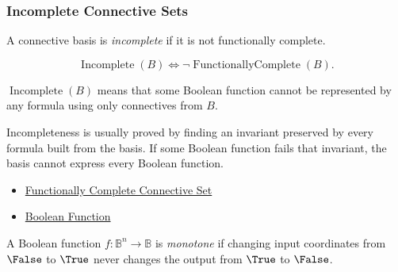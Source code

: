 \subsubsection*{Incomplete Connective Sets}

\begin{tcolorbox}[colback=propbox, colframe=propborder, arc=2pt,
  left=6pt, right=6pt, top=4pt, bottom=4pt,
  title={\small\textbf{Definition (Incomplete Connective Set)}},
  fonttitle=\small\bfseries]
\begin{definition}
\label{def:incomplete-connective-set-propositional-logic}
A connective basis is \emph{incomplete} if it is not functionally complete.
\end{definition}
\end{tcolorbox}

\begin{remark*}
\[
\operatorname{Incomplete}(B)
\Longleftrightarrow
\neg\operatorname{FunctionallyComplete}(B).
\]
\end{remark*}

\begin{remark*}
\(\operatorname{Incomplete}(B)\) means that some Boolean function cannot be
represented by any formula using only connectives from \(B\).
\end{remark*}

\begin{remark*}[Interpretation]
Incompleteness is usually proved by finding an invariant preserved by every
formula built from the basis. If some Boolean function fails that invariant, the
basis cannot express every Boolean function.
\end{remark*}

\begin{dependencies}
\begin{itemize}
  \item \hyperref[def:functionally-complete-connective-set-propositional-logic]{Functionally Complete Connective Set}
  \item \hyperref[def:boolean-function-propositional-logic]{Boolean Function}
\end{itemize}
\end{dependencies}

\begin{tcolorbox}[colback=propbox, colframe=propborder, arc=2pt,
  left=6pt, right=6pt, top=4pt, bottom=4pt,
  title={\small\textbf{Definition (Monotone Boolean Function)}},
  fonttitle=\small\bfseries]
\begin{definition}
\label{def:monotone-boolean-function-propositional-logic}
A Boolean function \(f:\mathbb{B}^n\to\mathbb{B}\) is \emph{monotone} if
changing input coordinates from \(\False\) to \(\True\) never changes the output
from \(\True\) to \(\False\).
\end{definition}
\end{tcolorbox}

